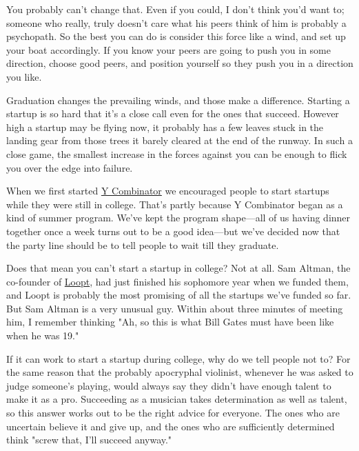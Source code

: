 You probably can't
                    change that. Even if you could, I don't think you'd want to;
                    someone who really, truly doesn't care what his peers think
                    of him is probably a psychopath. So the best you can do is
                    consider this force like a wind, and set up your boat
                    accordingly. If you know your peers are going to push you in
                    some direction, choose good peers, and position yourself so
                    they push you in a direction you like.

Graduation
                    changes the prevailing winds, and those make a difference.
                    Starting a startup is so hard that it's a close call even
                    for the ones that succeed. However high a startup may be
                    flying now, it probably has a few leaves stuck in the
                    landing gear from those trees it barely cleared at the end
                    of the runway. In such a close game, the smallest increase
                    in the forces against you can be enough to flick you over
                    the edge into failure.

When we first started
                    \href{http://ycombinator.com}{Y Combinator} we
                    encouraged people to start startups while they were still in
                    college. That's partly because Y Combinator began as a kind
                    of summer program. We've kept the program shape---all of
                    us having dinner together once a week turns out to be a good
                    idea---but we've decided now that the party line should
                    be to tell people to wait till they graduate.

Does
                    that mean you can't start a startup in college? Not at all.
                    Sam Altman, the co-founder of
                    \href{http://loopt.com}{Loopt}, had just finished his
                    sophomore year when we funded them, and Loopt is probably
                    the most promising of all the startups we've funded so far.
                    But Sam Altman is a very unusual guy. Within about three
                    minutes of meeting him, I remember thinking "Ah, so this is
                    what Bill Gates must have been like when he was 19."

If
                    it can work to start a startup during college, why do we
                    tell people not to? For the same reason that the probably
                    apocryphal violinist, whenever he was asked to judge
                    someone's playing, would always say they didn't have enough
                    talent to make it as a pro. Succeeding as a musician takes
                    determination as well as talent, so this answer works out to
                    be the right advice for everyone. The ones who are uncertain
                    believe it and give up, and the ones who are sufficiently
                    determined think "screw that, I'll succeed anyway."

